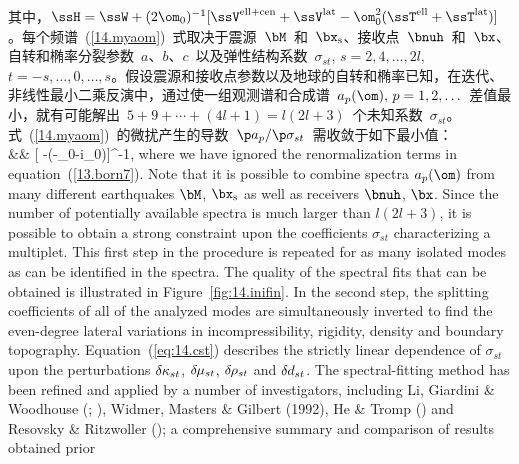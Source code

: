 \fi
其中，$\ssH=\ssW+(2\om_0)^{-1}[\ssV^{\rm ell+cen}+
\ssV^{\rm lat}-\om_0^2(\ssT^{\rm ell}+\ssT^{\rm lat})]$。每个频谱~(\ref{14.myaom})~式取决于震源~$\bM$~和~$\bx_{\rm s}$、接收点~$\bnuh$~和~$\bx$、自转和椭率分裂参数~$a$、$b$、$c$~以及弹性结构系数~$\sigma_{st}$, $s=2,4,\ldots,2l$,
$t=-s,\ldots,0,\ldots,s$。假设震源和接收点参数以及地球的自转和椭率已知，在迭代、非线性最小二乘反演中，通过使一组观测谱和合成谱~$a_p(\om),\,p=1,2,\ldots$~差值最小，就有可能解出~$5+9+\cdots +(4l+1)=l(2l+3)$~个未知系数~$\sigma_{st}$。式~(\ref{14.myaom})~的微扰产生的导数~$\p a_p/\p\sigma_{st}$~需收敛于如下最小值：
\eqa \label{14.Frechet}  \nonumber \\
&&\mbox{}\qquad\qquad\times\ssdelta\ssH
\hspace{0.4 mm}[\ssH
-(\omega-\omega_0-i\gamma_0)\ssI]^{-1}\sss,
\ena
\iffalse
where we have ignored the renormalization terms in
equation~(\ref{13.born7}).  Note that it is possible
to combine spectra $a_p(\om)$ from many different
earthquakes $\bM$, $\bx_{\rm s}$ as well as receivers
$\bnuh$, $\bx$.  Since the
number of potentially available spectra is much
larger than $l(2l+3)$, it is possible to
obtain a strong constraint upon the coefficients
$\sigma_{st}$ characterizing a multiplet.  This
first step in the procedure is repeated for as many
isolated modes as can be identified in the spectra.
The quality of the spectral fits that can be obtained is
illustrated in Figure~\ref{fig:14.inifin}.
In the second step, the splitting coefficients
of all of the analyzed modes are simultaneously
inverted to find the even-degree lateral variations
in incompressibility, rigidity, density
and boundary topography.  Equation~(\ref{eq:14.cst})
describes the strictly linear dependence of $\sigma_{st}$
upon the perturbations $\delta\hspace{-0.1 mm}\kappa_{st}$,
$\delta\hspace{-0.2 mm}\mu_{st}$, $\delta\hspace{-0.2 mm}\rho_{st}$
and $\delta\hspace{-0.1 mm}d_{st}$.  The spectral-fitting method
has been refined and applied by a number of investigators,
including Li, Giardini \& Woodhouse (\citeyear{li&al91}; \citeyear{li&al91b}),
Widmer, Masters \& Gilbert (1992),\nocite{widmer&al92}
He \& Tromp (\citeyear{he&tromp96}) and Resovsky \& Ritzwoller
(\citeyear{resovsky&ritzwoller98});
a comprehensive summary and comparison of results obtained prior
